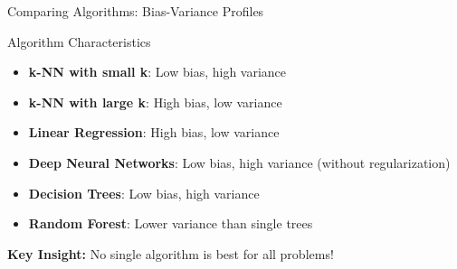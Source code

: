 \documentclass[aspectratio=169,10pt]{beamer}
\begin{document}
\begin{frame}{Comparing Algorithms: Bias-Variance Profiles}
\begin{definitionbox}{Algorithm Characteristics}
\begin{itemize}
\item \textbf{k-NN with small k}: Low bias, high variance
\item \textbf{k-NN with large k}: High bias, low variance
\item \textbf{Linear Regression}: High bias, low variance
\item \textbf{Deep Neural Networks}: Low bias, high variance (without regularization)
\item \textbf{Decision Trees}: Low bias, high variance
\item \textbf{Random Forest}: Lower variance than single trees
\end{itemize}
\end{definitionbox}

\textbf{Key Insight:} No single algorithm is best for all problems!
\end{frame}
\end{document}
